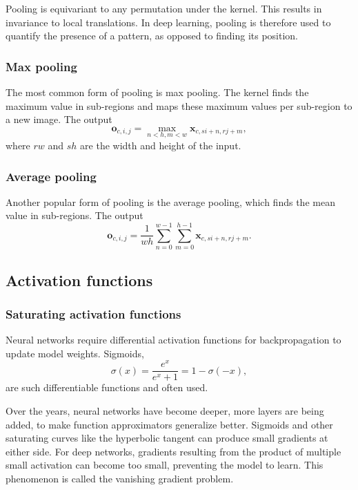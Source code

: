 Pooling is equivariant to any permutation under the kernel.
This results in invariance to local translations.
In deep learning, pooling is therefore used to quantify the presence of a pattern, as opposed to finding its position.

\subsubsection{Max pooling}\label{subsec:maxpool}
The most common form of pooling is max pooling.
The kernel finds the maximum value in sub-regions and maps these maximum values per sub-region to a new image.
The output
\begin{equation}
    \mathbf{o}_{c, i, j} = \max_{n < h, m < w}\mathbf{x}_{c, si+n, rj+m},
\end{equation}
where $rw$ and $sh$ are the width and height of the input.

\subsubsection{Average pooling}\label{subsec:avgpool}
Another popular form of pooling is the average pooling, which finds the mean value in sub-regions.
The output
\begin{equation}
    \mathbf{o}_{c, i, j} = \frac{1}{wh}\sum_{n=0}^{w-1}\sum_{m=0}^{h-1}\mathbf{x}_{c,si+n,rj+m}.
\end{equation}

\subsection{Activation functions}\label{sec:activations}

\subsubsection{Saturating activation functions}

Neural networks require differential activation functions for backpropagation to update model weights.
Sigmoids,
\begin{equation}
    \sigma(x) = \frac{e^x}{e^x + 1} = 1 - \sigma(-x),
\end{equation}
are such differentiable functions and often used.

Over the years, neural networks have become deeper, \ie more layers are being added, to make function approximators generalize better.
Sigmoids and other saturating curves like the hyperbolic tangent can produce small gradients at either side.
For deep networks, gradients resulting from the product of multiple small activation can become too small, preventing the model to learn.
This phenomenon is called the vanishing gradient problem.

